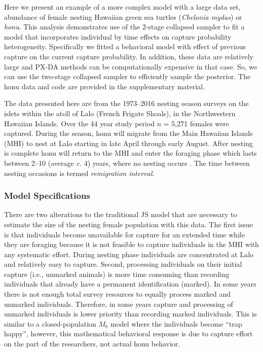 \documentclass[11pt]{article}
\begin{document}
Here we present an example of a more complex model with a large data set, abundance of female nesting Hawaiian green sea turtles ({\it Chelonia mydas}) or {\it honu}. This analysis demonstrates use of the 2-stage collapsed sampler to fit a model that incorporates individual by time effects on capture probability heterogeneity. Specifically we fitted a behavioral model with effect of previous capture on the current capture probability. In addition, these data are relatively large and PX-DA methods can be computationally expensive in that case. So, we can use the two-stage collapsed sampler to efficiently sample the posterior. The honu data and code are provided in the supplementary material.  

The data presented here are from the 1973--2016 nesting season surveys on the islets within the atoll of Lalo (French Frigate Shoals), in the Northwestern Hawaiian Islands. Over the 44 year study period $n$ = 5,271 females were captured. During the season, honu will migrate from the Main Hawaiian Islands (MHI) to nest at Lalo starting in late April through early August. After nesting is complete honu will return to the MHI and enter the foraging phase which lasts between 2--10 (average {\it c.} 4) years, where no nesting occurs \citep{BalazsEtAl2015a}. The time between nesting occasions is termed {\it remigration interval}. 


\subsubsection{Model Specifications}

There are two alterations to the traditional JS model that are necessary to estimate the size of the nesting female population with this data. The first issue is that individuals become unavailable for capture for an extended time while they are foraging because it is not feasible to capture individuals in the MHI with any systematic effort. During nesting phase individuals are concentrated at Lalo and relatively easy to capture. Second, processing individuals on their initial capture (i.e., unmarked animals) is more time consuming than recording individuals that already have a permanent identification (marked). In some years there is not enough total survey resources to equally process marked and unmarked individuals. Therefore, in some years capture and processing of unmarked individuals is lower priority than recording marked individuals. This is similar to a closed-population $M_b$ model \citep{OtisEtAl1978a} where the individuals become ``trap happy'', however, this mathematical behavioral response is due to capture effort on the part of the researchers, not actual honu behavior.
\end{document}
